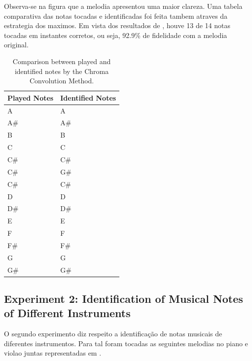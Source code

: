 \documentclass{article}
\begin{document}
	Observa-se na figura  que a melodia apresentou uma maior clareza. Uma tabela comparativa das notas tocadas e identificadas foi feita tambem atraves da estrategia dos maximos. Em vista dos resultados de , houve 13 de 14 notas tocadas em instantes corretos, ou seja, 92.9\% de fidelidade com a melodia original.

	\newpage

	\begin{table}[h]
	 \begin{center}
	 \begin{tabular}{|l|l|}
	  \hline
	  Played Notes & Identified Notes \\
	  \hline
	  A  & A \\
	  A\#  & A\# \\
	  B  & B \\
	  C  & C \\
	  C\#  & C\# \\
	  C\#  & G\# \\
	  C\#  & C\# \\
	  D  & D \\
	  D\#  & D\# \\
	  E  & E \\
	  F  & F \\
	  F\#  & F\# \\
	  G  & G \\
	  G\#  & G\# \\
	  \hline
	 \end{tabular}
	\end{center}
	 \caption{Comparison between played and identified notes by the Chroma Convolution Method.}
	 \label{tab:table-1-ccm}
	\end{table}


	\subsection{Experiment 2: Identification of Musical Notes of Different Instruments}

	O segundo experimento diz respeito a identificação de notas musicais de diferentes instrumentos. Para tal foram tocadas as seguintes melodias no piano e violao juntas representadas em .
\end{document}
